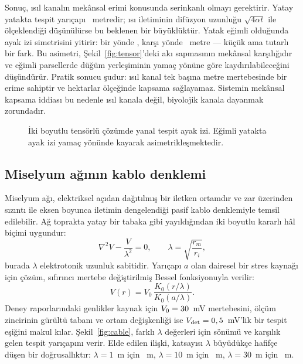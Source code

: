 \documentclass[11pt,a4paper]{article}
\begin{document}
Sonuç, ısıl kanalın mekânsal erimi konusunda serinkanlı olmayı gerektirir.
Yatay yatakta tespit yarıçapı \latRzero~metredir; ısı iletiminin difüzyon
uzunluğu $\sqrt{4\alpha t}$ ile ölçeklendiği düşünülürse bu beklenen bir
büyüklüktür. Yatak eğimli olduğunda ayak izi simetrisini yitirir: bir yönde
\latRdown, karşı yönde \latRup~metre — küçük ama tutarlı bir fark. Bu asimetri,
Şekil~\ref{fig:tensor}'deki akı sapmasının mekânsal karşılığıdır ve eğimli
parsellerde düğüm yerleşiminin yamaç yönüne göre kaydırılabileceğini
düşündürür. Pratik
sonucu şudur: ısıl kanal tek başına metre mertebesinde bir erime sahiptir ve
hektarlar ölçeğinde kapsama sağlayamaz. Sistemin mekânsal kapsama iddiası bu
nedenle ısıl kanala değil, biyolojik kanala dayanmak zorundadır.

\begin{figure}[htbp]\centering

\caption{İki boyutlu tensörlü çözümde yanal tespit ayak izi. Eğimli yatakta
ayak izi yamaç yönünde kayarak asimetrikleşmektedir.}
\label{fig:lateral}
\end{figure}

\subsection{Miselyum ağının kablo denklemi}

Miselyum ağı, elektriksel açıdan dağıtılmış bir iletken ortamdır ve zar
üzerinden sızıntı ile eksen boyunca iletimin dengelendiği pasif kablo
denklemiyle temsil edilebilir. Ağ toprakta yatay bir tabaka gibi yayıldığından
iki boyutlu kararlı hâl biçimi uygundur:
\begin{equation}
\nabla^2 V - \frac{V}{\lambda^2} = 0,
\qquad \lambda = \sqrt{\frac{r_m}{r_i}},
\end{equation}
burada $\lambda$ elektrotonik uzunluk sabitidir. Yarıçapı $a$ olan dairesel
bir stres kaynağı için çözüm, sıfırıncı mertebe değiştirilmiş Bessel
fonksiyonuyla verilir:
\begin{equation}
V(r) = V_0\,\frac{K_0(r/\lambda)}{K_0(a/\lambda)} .
\label{eq:cable}
\end{equation}
Deney raporlarındaki genlikler kaynak için $V_0 = 30$~mV mertebesini,
ölçüm zincirinin gürültü tabanı ve ortam değişkenliği ise
$V_{\mathrm{det}} = 0,5$~mV'lik bir tespit eşiğini makul kılar.
Şekil~\ref{fig:cable}, farklı $\lambda$ değerleri için sönümü ve karşılık gelen
tespit yarıçapını verir. Elde edilen ilişki, katsayısı $\lambda$ büyüdükçe
hafifçe düşen bir doğrusallıktır: $\lambda = 1$~m için \rdetOne~m,
$\lambda = 10$~m için \rdetTen~m, $\lambda = 30$~m için \rdetThirty~m.
\end{document}
